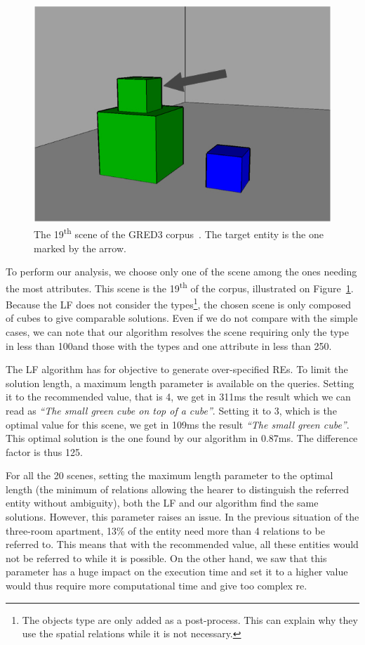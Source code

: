 \begin{figure}[ht!]
\centering
\includegraphics[scale=0.3]{figures/chapter4/GRED3.jpg}
\caption{\label{fig:chap4_gred3} The 19\textsuperscript{th} scene of the GRED3 corpus~\cite{dale_2009_referring}. The target entity is the one marked by the arrow.}
\end{figure}

To perform our analysis, we choose only one of the scene among the ones needing the most attributes. This scene is the 19\textsuperscript{th} of the corpus, illustrated on Figure~\ref{fig:chap4_gred3}. Because the LF does not consider the types\footnote{The objects type are only added as a post-process. This can explain why they use the spatial relations while it is not necessary.}, the chosen scene is only composed of cubes to give comparable solutions. Even if we do not compare with the simple cases, we can note that our algorithm resolves the scene requiring only the type in less than 100\us and those with the types and one attribute in less than 250\us.

The LF algorithm has for objective to generate over-specified REs. To limit the solution length, a maximum length parameter is available on the queries. Setting it to the recommended value, that is 4, we get in 311ms the result which we can read as \textit{``The small green cube on top of a cube''}. Setting it to 3, which is the optimal value for this scene, we get in 109ms the result \textit{``The small green cube''}. This optimal solution is the one found by our algorithm in 0.87ms. The difference factor is thus 125.

For all the 20 scenes, setting the maximum length parameter to the optimal length (the minimum of relations allowing the hearer to distinguish the referred entity without ambiguity), both the LF and our algorithm find the same solutions. However, this parameter raises an issue. In the previous situation of the three-room apartment, 13\% of the entity need more than 4 relations to be referred to. This means that with the recommended value, all these entities would not be referred to while it is possible. On the other hand, we saw that this parameter has a huge impact on the execution time and set it to a higher value would thus require more computational time and give too complex \acrshort{re}.

